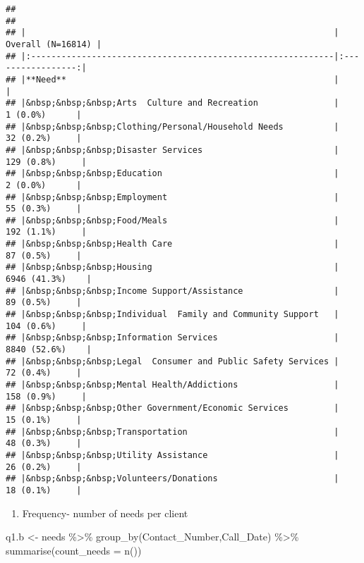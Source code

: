 \documentclass[
]{article}
\newenvironment{Shaded}{\begin{snugshade}}{\end{snugshade}}
\newcommand{\AttributeTok}[1]{\textcolor[rgb]{0.77,0.63,0.00}{#1}}
\newcommand{\FunctionTok}[1]{\textcolor[rgb]{0.00,0.00,0.00}{#1}}
\newcommand{\NormalTok}[1]{#1}
\newcommand{\OtherTok}[1]{\textcolor[rgb]{0.56,0.35,0.01}{#1}}
\newcommand{\SpecialCharTok}[1]{\textcolor[rgb]{0.00,0.00,0.00}{#1}}
\providecommand{\tightlist}{%
  \setlength{\itemsep}{0pt}\setlength{\parskip}{0pt}}
\begin{document}
\begin{verbatim}
## 
## 
## |                                                             | Overall (N=16814) |
## |:------------------------------------------------------------|:-----------------:|
## |**Need**                                                     |                   |
## |&nbsp;&nbsp;&nbsp;Arts  Culture and Recreation               |     1 (0.0%)      |
## |&nbsp;&nbsp;&nbsp;Clothing/Personal/Household Needs          |     32 (0.2%)     |
## |&nbsp;&nbsp;&nbsp;Disaster Services                          |    129 (0.8%)     |
## |&nbsp;&nbsp;&nbsp;Education                                  |     2 (0.0%)      |
## |&nbsp;&nbsp;&nbsp;Employment                                 |     55 (0.3%)     |
## |&nbsp;&nbsp;&nbsp;Food/Meals                                 |    192 (1.1%)     |
## |&nbsp;&nbsp;&nbsp;Health Care                                |     87 (0.5%)     |
## |&nbsp;&nbsp;&nbsp;Housing                                    |   6946 (41.3%)    |
## |&nbsp;&nbsp;&nbsp;Income Support/Assistance                  |     89 (0.5%)     |
## |&nbsp;&nbsp;&nbsp;Individual  Family and Community Support   |    104 (0.6%)     |
## |&nbsp;&nbsp;&nbsp;Information Services                       |   8840 (52.6%)    |
## |&nbsp;&nbsp;&nbsp;Legal  Consumer and Public Safety Services |     72 (0.4%)     |
## |&nbsp;&nbsp;&nbsp;Mental Health/Addictions                   |    158 (0.9%)     |
## |&nbsp;&nbsp;&nbsp;Other Government/Economic Services         |     15 (0.1%)     |
## |&nbsp;&nbsp;&nbsp;Transportation                             |     48 (0.3%)     |
## |&nbsp;&nbsp;&nbsp;Utility Assistance                         |     26 (0.2%)     |
## |&nbsp;&nbsp;&nbsp;Volunteers/Donations                       |     18 (0.1%)     |
\end{verbatim}

\begin{enumerate}
\def\labelenumi{\alph{enumi}.}
\setcounter{enumi}{1}
\tightlist
\item
  Frequency- number of needs per client
\end{enumerate}

\begin{Shaded}
\begin{Highlighting}[]
\NormalTok{q1.b }\OtherTok{\textless{}{-}}\NormalTok{ needs }\SpecialCharTok{\%\textgreater{}\%} \FunctionTok{group\_by}\NormalTok{(Contact\_Number,Call\_Date) }\SpecialCharTok{\%\textgreater{}\%} \FunctionTok{summarise}\NormalTok{(}\AttributeTok{count\_needs =} \FunctionTok{n}\NormalTok{())}
\end{Highlighting}
\end{Shaded}
\end{document}
